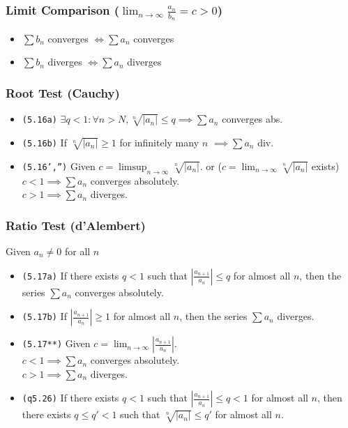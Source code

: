 \documentclass[a4paper,landscape]{article}
\newcommand{\tnum}[1]{{\color{gray}\footnotesize\texttt{(#1)}}}
\begin{document}
\begin{multicols}{2}
\subsubsection{Limit Comparison ({\small $\displaystyle\lim_{n\to\infty} \frac{a_n}{b_n} = c > 0$})}

\begin{itemize}
\item $\sum b_n$ converges $\iff \sum a_n$ converges
\item  $\sum b_n$ diverges $\iff \sum a_n$ diverges 
\end{itemize}

\subsubsection{Root Test (Cauchy)}

\begin{itemize}

\item \tnum{5.16a}  $\exists q<1:\forall n> N,\sqrt[n]{|a_n|}\leq q\implies\sum a_n$ converges abs. 
\item \tnum{5.16b} If $\sqrt[n]{|a_n|}\geq 1$ for infinitely many $n$  $\implies\sum a_n$ div.

\item \tnum{5.16',''} Given $c=\displaystyle\limsup_{n\to\infty}\sqrt[n]{|a_n|}$. or ($c=\displaystyle\lim_{n\to\infty}\sqrt[n]{|a_n|}$ exists) \\
    $c<1\implies\sum a_n$ converges absolutely.\\
    $c>1\implies\sum a_n$ diverges.
\end{itemize}

\columnbreak

\subsubsection{Ratio Test (d'Alembert)}
Given $a_n\neq0$ for all $n$

\begin{itemize}


\item \tnum{5.17a} If there exists $q<1$ such that $\left|\frac{a_{n+1}}{a_n}\right|\leq q$ for almost all $n$, then the series $\sum a_n$ converges absolutely.
\item \tnum{5.17b} If $\left|\frac{a_{n+1}}{a_n}\right|\geq 1$ for almost all $n$, then the series $\sum a_n$ diverges.    
\item \tnum{5.17**} Given $c=\lim_{n\to\infty}\left|\frac{a_{n+1}}{a_n}\right|$.
    \\ $c<1\implies\sum a_n$ converges absolutely.
    \\ $c>1\implies\sum a_n$ diverges.
\item \tnum{q5.26} If there exists $q<1$ such that $\left|\frac{a_{n+1}}{a_n}\right|\leq q<1$ for almost all $n$, then there exists $q\leq q'<1$ such that $\sqrt[n]{|a_n|}\leq q'$ for almost all $n$.
\end{itemize}




\end{multicols}
\end{document}
